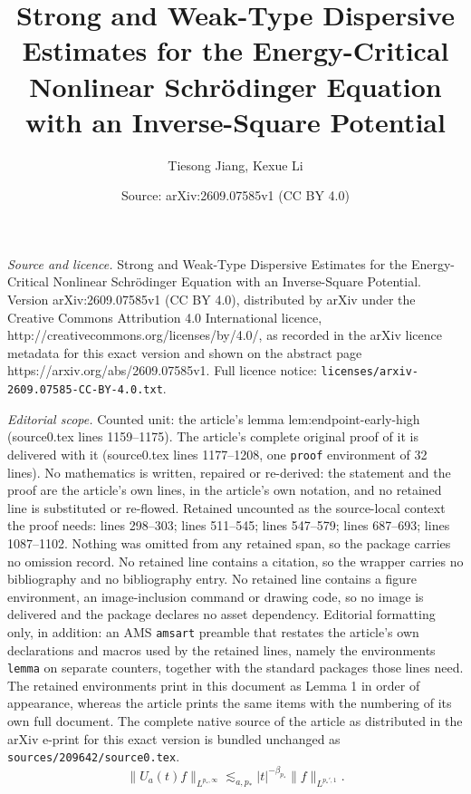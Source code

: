 \documentclass[10pt,a4paper]{amsart}
\title{Strong and Weak-Type Dispersive Estimates for the Energy-Critical Nonlinear Schrödinger Equation with an Inverse-Square Potential}
\author{Tiesong Jiang, Kexue Li}
\date{Source: arXiv:2609.07585v1 (CC BY 4.0)}
\newcommand{\norm}[2]{\lVert #1\rVert_{#2}}
\begin{document}
\maketitle

\noindent\emph{Source and licence.} Strong and Weak-Type Dispersive Estimates for the Energy-Critical Nonlinear Schrödinger Equation with an Inverse-Square Potential. Version arXiv:2609.07585v1 (CC BY 4.0), distributed by arXiv under the Creative Commons Attribution 4.0 International licence, http://creativecommons.org/licenses/by/4.0/, as recorded in the arXiv licence metadata for this exact version and shown on the abstract page https://arxiv.org/abs/2609.07585v1. Full licence notice: \texttt{licenses/arxiv-2609.07585-CC-BY-4.0.txt}.\par\smallskip

\noindent\textit{Editorial scope.} Counted unit: the article's lemma lem:endpoint-early-high (source0.tex lines 1159--1175). The article's complete original proof of it is delivered with it (source0.tex lines 1177--1208, one \texttt{proof} environment of 32 lines). No mathematics is written, repaired or re-derived: the statement and the proof are the article's own lines, in the article's own notation, and no retained line is substituted or re-flowed.  Retained uncounted as the source-local context the proof needs: lines 298--303; lines 511--545; lines 547--579; lines 687--693; lines 1087--1102.  Nothing was omitted from any retained span, so the package carries no omission record.  No retained line contains a citation, so the wrapper carries no bibliography and no bibliography entry.  No retained line contains a figure environment, an image-inclusion command or drawing code, so no image is delivered and the package declares no asset dependency.  Editorial formatting only, in addition: an AMS \texttt{amsart} preamble that restates the article's own declarations and macros used by the retained lines, namely the environments \texttt{lemma} on separate counters, together with the standard packages those lines need.  The retained environments print in this document as Lemma 1 in order of appearance, whereas the article prints the same items with the numbering of its own full document.  The complete native source of the article as distributed in the arXiv e-print for this exact version is bundled unchanged as \texttt{sources/209642/source0.tex}.
 \begin{equation}
  \norm{U_a(t)f}{L^{p_*,\infty}}
  \lesssim_{a,p_*}|t|^{-\beta_{p_*}}
  \norm{f}{L^{p_*',1}}.
  \label{eq:linear-weak-endpoint}
 \end{equation}
\end{document}

